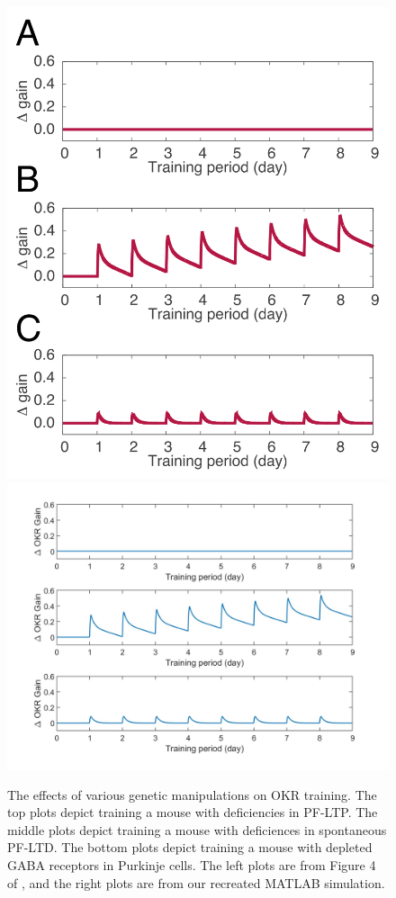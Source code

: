 \documentclass[10pt]{article}
\begin{document}
\begin{figure}[h]
    \centering
    \includegraphics[scale=0.7]{images/Fig4_orig.png}
    \includegraphics[scale=0.14]{images/Fig4_rec.jpg}
    \caption{The effects of various genetic manipulations on OKR training. The top plots depict training a mouse with deficiencies in PF-LTP. The middle plots depict training a mouse with deficiences in spontaneous PF-LTD. The bottom plots depict training a mouse with depleted GABA receptors in Purkinje cells. The left plots are from Figure 4 of \cite{yamazaki2015modeling}, and the right plots are from our recreated MATLAB simulation.}
    \label{fig:gene-modified_training}
\end{figure}
\end{document}
